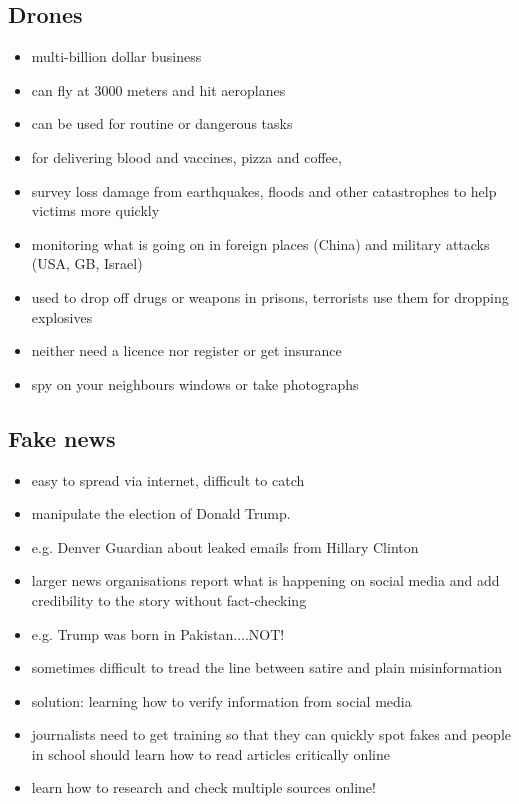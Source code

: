 \documentclass[a5paper,12pt,twoside,titlepage]{scrartcl}
\begin{document}
\subsection{Drones}
\begin{itemize}
	\item multi-billion dollar business
	\item can fly at 3000 meters and hit aeroplanes
	\item can be used for routine or dangerous tasks 
	\item for delivering blood and vaccines, pizza and coffee, 
	\item survey loss damage from earthquakes, floods and other catastrophes to help victims more quickly
	\item monitoring what is going on in foreign places (China) and military attacks (USA, GB, Israel)
	\item used to drop off drugs or weapons in prisons, terrorists use them for dropping explosives
	\item neither need a licence nor register or get insurance
	\item spy on your neighbours windows or take photographs
\end{itemize}

\subsection{Fake news}
\begin{itemize}
	\item easy to spread via internet, difficult to catch
	\item manipulate the election of Donald Trump. 
	\item e.g. Denver Guardian about leaked emails from Hillary Clinton
	\item larger news organisations report what is happening on social media and add credibility to the story without fact-checking
	\item e.g. Trump was born in Pakistan....NOT!
	\item sometimes difficult to tread the line between satire and plain misinformation
	\item solution: learning how to verify information from social media
	\item journalists need to get training so that they can quickly spot fakes and people in school should learn how to read articles critically online
	\item learn how to research and check multiple sources online!
\end{itemize}
\end{document}

